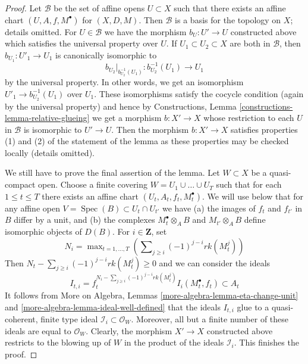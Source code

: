 \documentclass[10pt,a4paper]{amsart}
\theoremstyle{plain}
\theoremstyle{definition}
\theoremstyle{remark}
\numberwithin{equation}{subsection}
\def\Spec{\mathop{\mathrm{Spec}}}
\begin{document}
\begin{proof}
\medskip\noindent
Let $\mathcal{B}$ be the set of affine opens $U \subset X$
such that there exists an affine chart $(U, A, f, M^\bullet)$
for $(X, D, M)$. Then $\mathcal{B}$ is a basis for the topology
on $X$; details omitted. For $U \in \mathcal{B}$ we have
the morphism $b_U : U' \to U$ constructed above which satisfies
the universal property over $U$. If $U_1 \subset U_2 \subset X$
are both in $\mathcal{B}$, then $b_{U_1} : U'_1 \to U_1$
is canonically isomorphic to
$$
b_{U_2}|_{b_{U_2}^{-1}(U_1)} : b_{U_2}^{-1}(U_1) \longrightarrow U_1
$$
by the universal property. In other words, we get an isomorphism
$U'_1 \to b_{U_2}^{-1}(U_1)$ over $U_1$. These isomorphisms satisfy
the cocycle condition (again by the universal property) and hence by
Constructions, Lemma \ref{constructions-lemma-relative-glueing}
we get a morphism $b : X' \to X$ whose restriction to each
$U$ in $\mathcal{B}$ is isomorphic to $U' \to U$.
Then the morphism $b : X' \to X$ satisfies properties (1) and (2)
of the statement of the lemma as these properties may be checked
locally (details omitted).

\medskip\noindent
We still have to prove the final assertion of the lemma.
Let $W \subset X$ be a quasi-compact open.
Choose a finite covering $W = U_1 \cup \ldots \cup U_T$
such that for each $1 \leq t \leq T$ there exists an affine chart
$(U_t, A_t, f_t, M_t^\bullet)$. We will use below that for any affine
open $V = \Spec(B) \subset U_t \cap U_{t'}$ we have
(a) the images of $f_t$ and $f_{t'}$ in $B$ differ by a unit, and
(b) the complexes $M_t^\bullet \otimes_A B$ and $M_{t'} \otimes_A B$
define isomorphic objects of $D(B)$. For $i \in \mathbf{Z}$, set
$$
N_i = \max\nolimits_{t = 1, \ldots, T}
\left(\sum\nolimits_{j \geq i} (-1)^{j - i} rk(M_t^j)\right)
$$
Then $N_t - \sum\nolimits_{j \geq i} (-1)^{j - i} rk(M_t^j) \geq 0$
and we can consider the ideals
$$
I_{t, i} =
f_t^{N_i - \sum\nolimits_{j \geq i} (-1)^{j - i} rk(M_t^j)}
I_i(M_t^\bullet, f_t)
\subset A_t
$$
It follows from More on Algebra, Lemmas
\ref{more-algebra-lemma-eta-change-unit} and
\ref{more-algebra-lemma-ideal-well-defined}
that the ideals $I_{t, i}$ glue to a quasi-coherent, finite type
ideal $\mathcal{I}_i \subset \mathcal{O}_W$. Moreover, all but
a finite number of these ideals are equal to $\mathcal{O}_W$.
Clearly, the morphism $X' \to X$ constructed above
restricts to the blowing up of $W$ in the product
of the ideals $\mathcal{I}_i$. This finishes the proof.
\end{proof}
\end{document}
